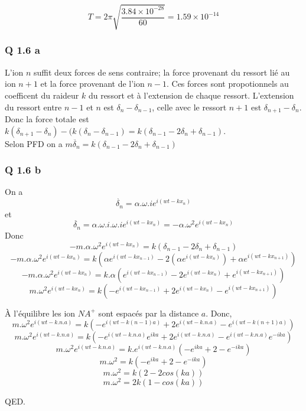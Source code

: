 \documentclass[]{book}
\theoremstyle{definition}
\begin{document}
$$T = 2\pi \sqrt{\frac{3.84\times10^{-28}}{60}} = 1.59\times10^{-14}$$

\subsubsection*{Q 1.6 a}
L'ion $n$ suffit deux forces de sens contraire; la force provenant du ressort li\'e au ion $n+1$ et la force provenant de l'ion $n-1$. Ces forces sont propotionnels au coefficent du raideur $k$ du ressort et \`a l'extension de chaque ressort. L'extension du ressort entre $n-1$ et $n$ est $\delta_{n} - \delta_{n-1}$, celle avec le ressort $n+1$ est $\delta_{n+1} - \delta_{n}$. Donc la force totale est $k(\delta_{n+1} - \delta_{n}) - (k(\delta_{n} - \delta_{n-1}) = k(\delta_{n-1} -2\delta_{n} + \delta_{n-1})$.\\ 

Selon PFD on a $m\ddot{\delta_{n}} = k(\delta_{n-1} -2\delta_{n} + \delta_{n-1})$


\subsubsection*{Q 1.6 b}
On a $$\dot{\delta_{n}} = \alpha.\omega.i e^{i(wt-kx_n)}$$
et $$\ddot{\delta_{n}} = \alpha.\omega.i.\omega.i e^{i(wt-kx_n)} = -\alpha.\omega^2 e^{i(wt-kx_n)}$$
Donc
$$-m.\alpha.\omega^2 e^{i(wt-kx_n)} = k(\delta_{n-1} -2\delta_{n} + \delta_{n-1})$$
$$-m.\alpha.\omega^2 e^{i(wt-kx_n)} = k(\alpha e^{i(wt-kx_{n-1})} -2(\alpha e^{i(wt-kx_n)}) + \alpha e^{i(wt-kx_{n+1})})$$
$$-m.\alpha.\omega^2 e^{i(wt-kx_n)} = k.\alpha( e^{i(wt-kx_{n-1})} -2e^{i(wt-kx_n)} + e^{i(wt-kx_{n+1})})$$
$$m.\omega^2 e^{i(wt-kx_n)} = k( -e^{i(wt-kx_{n-1})} +2e^{i(wt-kx_n)} - e^{i(wt-kx_{n+1})})$$

\`A l'\'equilibre les ion $NA^{+}$ sont espac\'es par la distance $a$. Donc,
$$m.\omega^2 e^{i(wt-k.n.a)} = k( -e^{i(wt-k(n-1)a)} +2e^{i(wt-k.n.a)} - e^{i(wt-k(n+1)a)})$$
$$m.\omega^2 e^{i(wt-k.n.a)} = k( -e^{i(wt-k.n.a)}e^{ika} + 2e^{i(wt-k.n.a)} - e^{i(wt-k.n.a)}e^{-ika})$$
$$m.\omega^2 e^{i(wt-k.n.a)} = k.e^{i(wt-k.n.a)}( -e^{ika} + 2 - e^{-ika})$$
$$m.\omega^2 = k( -e^{ika} + 2 - e^{-ika})$$
$$m.\omega^2 = k( 2 - 2cos(ka))$$
$$m.\omega^2 = 2k( 1 - cos(ka))$$



QED.
\end{document}
